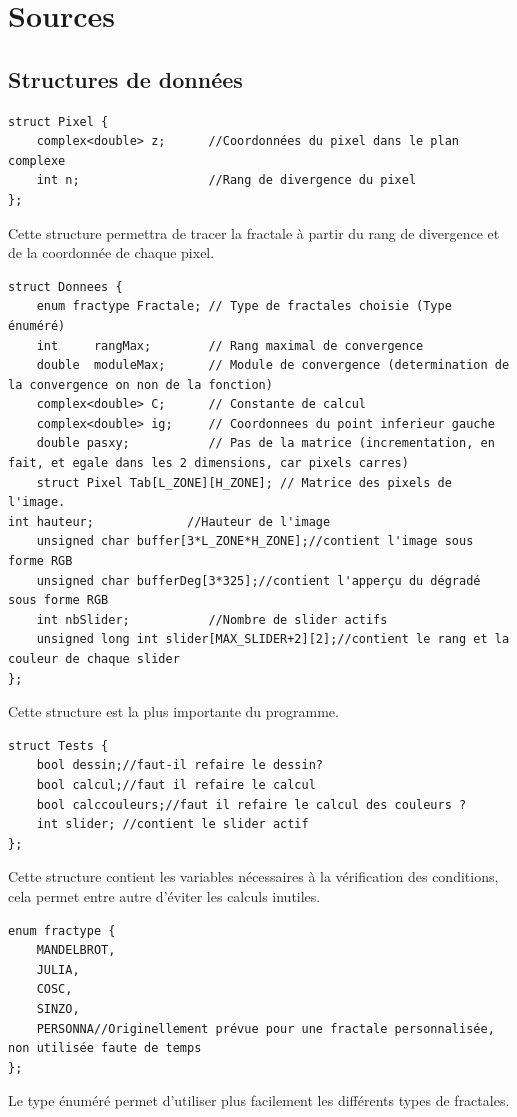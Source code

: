 \documentclass[a4paper,11pt]{article} \usepackage[T1]{fontenc} \usepackage[utf8]{inputenc} \usepackage[francais]{babel}
\begin{document}
\section{Sources}
\subsection{Structures de données}
\begin{lstlisting}
struct Pixel {
    complex<double> z;      //Coordonnées du pixel dans le plan complexe
    int n;                  //Rang de divergence du pixel
};
\end{lstlisting}
Cette structure permettra de tracer la fractale à partir du rang de divergence et de la coordonnée de chaque pixel.
\begin{lstlisting}
struct Donnees {
    enum fractype Fractale; // Type de fractales choisie (Type énuméré)
    int     rangMax;        // Rang maximal de convergence
    double  moduleMax;      // Module de convergence (determination de la convergence on non de la fonction)
    complex<double> C;      // Constante de calcul
    complex<double> ig;     // Coordonnees du point inferieur gauche
    double pasxy;           // Pas de la matrice (incrementation, en fait, et egale dans les 2 dimensions, car pixels carres)
    struct Pixel Tab[L_ZONE][H_ZONE]; // Matrice des pixels de l'image.
int hauteur;             //Hauteur de l'image
    unsigned char buffer[3*L_ZONE*H_ZONE];//contient l'image sous forme RGB
    unsigned char bufferDeg[3*325];//contient l'apperçu du dégradé sous forme RGB
    int nbSlider;           //Nombre de slider actifs
    unsigned long int slider[MAX_SLIDER+2][2];//contient le rang et la couleur de chaque slider
};

\end{lstlisting}
Cette structure est la plus importante du programme.

\begin{lstlisting}
struct Tests {
    bool dessin;//faut-il refaire le dessin?
    bool calcul;//faut il refaire le calcul
    bool calccouleurs;//faut il refaire le calcul des couleurs ?
    int slider; //contient le slider actif
};
\end{lstlisting}
Cette structure contient les variables nécessaires à la vérification des conditions, cela permet entre autre d’éviter les calculs inutiles.

\begin{lstlisting}
enum fractype {
    MANDELBROT,
    JULIA,
    COSC,
    SINZO,
    PERSONNA//Originellement prévue pour une fractale personnalisée, non utilisée faute de temps
};
\end{lstlisting}
Le type énuméré permet d'utiliser plus facilement les différents types de fractales.
\end{document}

